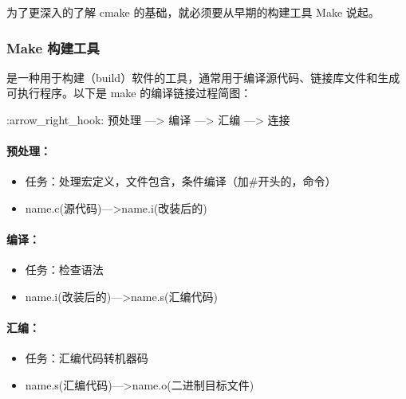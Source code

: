 \documentclass[a4paper,12pt,english]{sphinxmanual}
\begin{document}
\sphinxAtStartPar
为了更深入的了解 cmake 的基础，就必须要从早期的构建工具 Make 说起。


\subsubsection{Make 构建工具}
\label{\detokenize{dev-board/clion:make}}
\sphinxAtStartPar
{} 是一种用于构建（build）软件的工具，通常用于编译源代码、链接库文件和生成可执行程序。以下是 make 的编译链接过程简图：

\sphinxAtStartPar
:arrow\_right\_hook: 预处理 —> 编译 —> 汇编 —> 连接

\sphinxAtStartPar
{}


\paragraph{预处理：}
\label{\detokenize{dev-board/clion:id3}}\begin{itemize}
\item {} 
\sphinxAtStartPar
任务：处理宏定义，文件包含，条件编译（加\#开头的，命令）

\item {} 
\sphinxAtStartPar
name.c(源代码)—\sphinxhyphen{}>name.i(改装后的)

\end{itemize}


\paragraph{编译：}
\label{\detokenize{dev-board/clion:id4}}\begin{itemize}
\item {} 
\sphinxAtStartPar
任务：检查语法

\item {} 
\sphinxAtStartPar
name.i(改装后的)—\sphinxhyphen{}>name.s(汇编代码)

\end{itemize}


\paragraph{汇编：}
\label{\detokenize{dev-board/clion:id5}}\begin{itemize}
\item {} 
\sphinxAtStartPar
任务：汇编代码转机器码

\item {} 
\sphinxAtStartPar
name.s(汇编代码)—>name.o(二进制目标文件)

\sphinxAtStartPar
{}

\end{itemize}
\end{document}
